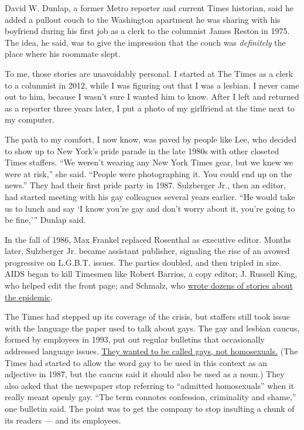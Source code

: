 David W. Dunlap, a former Metro reporter and current Times historian,
said he added a pullout couch to the Washington apartment he was sharing
with his boyfriend during his first job as a clerk to the columnist
James Reston in 1975. The idea, he said, was to give the impression that
the couch was \emph{definitely} the place where his roommate slept.

To me, those stories are unavoidably personal. I started at The Times as
a clerk to a columnist in 2012, while I was figuring out that I was a
lesbian. I never came out to him, because I wasn't sure I wanted him to
know. After I left and returned as a reporter three years later, I put a
photo of my girlfriend at the time next to my computer.

The path to my comfort, I now know, was paved by people like Lee, who
decided to show up to New York's pride parade in the late 1980s with
other closeted Times staffers. ``We weren't wearing any New York Times
gear, but we knew we were at risk,'' she said. ``People were
photographing it. You could end up on the news.'' They had their first
pride party in 1987. Sulzberger Jr., then an editor, had started meeting
with his gay colleagues several years earlier. ``He would take us to
lunch and say `I know you're gay and don't worry about it, you're going
to be fine,''' Dunlap said.

In the fall of 1986, Max Frankel replaced Rosenthal as executive editor.
Months later, Sulzberger Jr. became assistant publisher, signaling the
rise of an avowed progressive on L.G.B.T. issues. The parties doubled,
and then tripled in size. AIDS began to kill Timesmen like Robert
Barrios, a copy editor; J. Russell King, who helped edit the front page;
and Schmalz, who
\href{https://www.nytimes.com/1993/11/07/obituaries/jeffrey-schmalz-39-times-writer-on-politics-and-then-aids-dies.html}{wrote
dozens of stories about the epidemic}.

The Times had stepped up its coverage of the crisis, but staffers still
took issue with the language the paper used to talk about gays. The gay
and lesbian caucus, formed by employees in 1993, put out regular
bulletins that occasionally addressed language issues.
\href{https://www.nytimes.com/2014/03/23/fashion/gays-lesbians-the-term-homosexual.html}{They
wanted to be called gays, not homosexuals.} (The Times had started to
allow the word gay to be used in this context as an adjective in 1987,
but the caucus said it should also be used as a noun.) They also asked
that the newspaper stop referring to ``admitted homosexuals'' when it
really meant openly gay. ``The term connotes confession, criminality and
shame,'' one bulletin said. The point was to get the company to stop
insulting a chunk of its readers --- and its employees.

